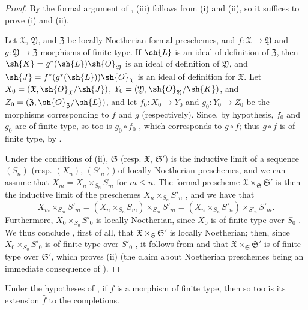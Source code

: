 \begin{proof}
By the formal argument of , (iii) follows from (i) and (ii), so it suffices to prove (i) and (ii).

Let $\mathfrak{X}$, $\mathfrak{Y}$, and $\mathfrak{Z}$ be locally Noetherian formal preschemes, and $f:\mathfrak{X}\to\mathfrak{Y}$ and $g:\mathfrak{Y}\to\mathfrak{Z}$ morphisms of finite type.
If $\sh{L}$ is an ideal of definition of $\mathfrak{Z}$, then $\sh{K}=g^*(\sh{L})\sh{O}_\mathfrak{Y}$ is an ideal of definition of $\mathfrak{Y}$, and $\sh{J}=f^*(g^*(\sh{L}))\sh{O}_\mathfrak{X}$ is an ideal of definition for $\mathfrak{X}$.
Let $X_0=(\mathfrak{X},\sh{O}_\mathfrak{X}/\sh{J})$, $Y_0=(\mathfrak{Y},\sh{O}_\mathfrak{Y}/\sh{K})$, and $Z_0=(\mathfrak{Z},\sh{O}_\mathfrak{Z}/\sh{L})$, and let $f_0:X_0\to Y_0$ and $g_0:Y_0\to Z_0$ be the morphisms corresponding to $f$ and $g$ (respectively).
Since, by hypothesis, $f_0$ and $g_0$ are of finite type, so too is $g_0\circ f_0$ , which corresponds to $g\circ f$;
thus $g\circ f$ is of finite type, by .

Under the conditions of (ii), $\mathfrak{S}$ (resp. $\mathfrak{X}$, $\mathfrak{S}'$) is the inductive limit of a sequence $(S_n)$ (resp. $(X_n)$, $(S'_n)$) of locally Noetherian preschemes, and we can assume  that $X_m=X_n\times_{S_n}S_m$ for $m\leq n$.
The formal prescheme $\mathfrak{X}\times_\mathfrak{S}\mathfrak{S}'$ is then the inductive limit of the preschemes $X_n\times_{S_n}S'_n$ , and we have that
\[
    X_m\times_{S_m}S'_m = (X_n\times_{S_n}S_m)\times_{S_m}S'_m = (X_n\times_{S_n}S'_n)\times_{S'_n}S'_m.
\]
Furthermore, $X_0\times_{S_0}S'_0$ is locally Noetherian, since $X_0$ is of finite type over $S_0$ .
We thus conclude , first of all, that $\mathfrak{X}\times_\mathfrak{S}\mathfrak{S}'$ is locally Noetherian;
then, since $X_0\times_{S_0}S'_0$ is of finite type over $S'_0$ , it follows from  and  that $\mathfrak{X}\times_\mathfrak{S}\mathfrak{S}'$ is of finite type over $\mathfrak{S}'$, which proves (ii) (the claim about Noetherian preschemes being an immediate consequence of ).
\end{proof}

\begin{corollary}[10.13.6]
\label{I.10.13.6}
Under the hypotheses of , if $f$ is a morphism of finite type, then so too is its extension $\widehat{f}$ to the completions.
\end{corollary}

